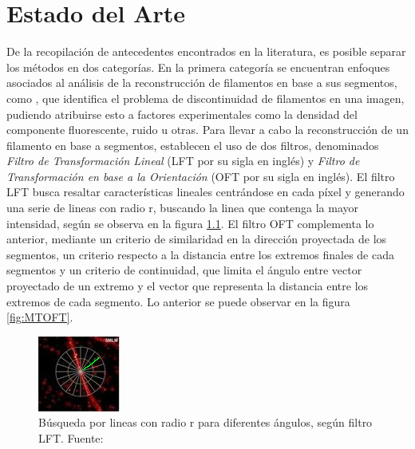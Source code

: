 \chapter{Estado del Arte}

De la recopilaci\'on de antecedentes encontrados en la literatura, es posible separar los m\'etodos en dos categor\'ias. En la primera categor\'ia se encuentran enfoques asociados al an\'alisis de la reconstrucci\'on de filamentos en base a sus segmentos, como \cite{zhang2017extracting}, que identifica el problema de discontinuidad de filamentos en una imagen, pudiendo atribuirse esto a factores experimentales como la densidad del componente fluorescente, ruido u otras. Para llevar a cabo la reconstrucci\'on de un filamento en base a segmentos, establecen el uso de dos filtros, denominados \textit{Filtro de Transformaci\'on Lineal} (LFT por su sigla en ingl\'es) y \textit{Filtro de Transformaci\'on en base a la Orientaci\'on} (OFT por su sigla en ingl\'es). 
El filtro LFT busca resaltar caracter\'isticas lineales centr\'andose en cada p\'ixel y generando una serie de lineas con radio r, buscando la linea que contenga la mayor intensidad, seg\'un se observa en la figura \ref{fig:MTLFT}. El filtro OFT complementa lo anterior, mediante un criterio de similaridad en la direcci\'on proyectada de los segmentos, un criterio respecto a la distancia entre los extremos finales de cada segmentos y un criterio de continuidad, que limita el \'angulo entre vector proyectado de un extremo y el vector que representa la distancia entre los extremos de cada segmento. Lo anterior se puede observar en la figura \ref{fig:MTOFT}.

\begin{figure}[h]
        \centering
        \includegraphics[scale=5]{imagenes/MT-LFT.jpeg}
        \caption{B\'usqueda por lineas con radio r para diferentes \'angulos, según filtro LFT. Fuente: \cite{zhang2017extracting}}
        \label{fig:MTLFT}
\end{figure}


